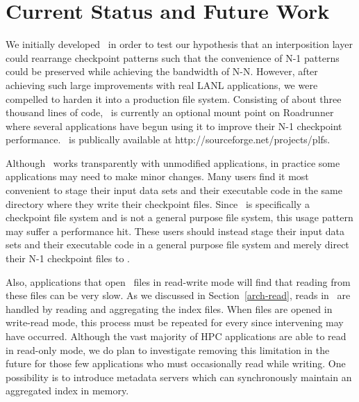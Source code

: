 \section{Current Status and Future Work}
\label{future}

We initially developed \plfs\ in order to test our hypothesis that an
interposition layer could rearrange checkpoint patterns such that the
convenience of N-1 patterns could be preserved while achieving the bandwidth of
N-N.  However, after achieving such large improvements with real LANL
applications, we were compelled to harden it 
into a production file system. Consisting of about three thousand lines of
code, \plfs\ is currently an optional mount point on Roadrunner where several
applications have begun using it to improve their N-1 checkpoint performance. 
\plfs\ is publically available at
http://sourceforge.net/projects/plfs.


Although \plfs\ works transparently with unmodified applications, in practice
some applications may need to make minor changes.  Many users find it most
convenient to stage their input data sets and their executable code in the same
directory where they write their checkpoint files.  Since \plfs\ is
specifically a checkpoint file system and is not a general purpose file system,
this usage pattern may suffer a performance hit.  These users should instead
stage their input data sets and their executable code in a general purpose file
system and merely direct their N-1 checkpoint files to \plfs.

Also, applications that open \plfs\ files in read-write mode will find that
reading from these files can be very slow.  As we discussed in
Section~\ref{arch-read}, reads in \plfs\ are handled by reading and aggregating
the index files.  When files are opened in write-read mode, this process must
be repeated for every  since intervening  may
have occurred.  Although the vast majority of HPC applications are able to read
in read-only mode, we do plan to investigate removing this limitation in the
future for those few applications who must occasionally read while writing.
One possibility is to introduce metadata servers which can synchronously
maintain an aggregated index in memory. 

